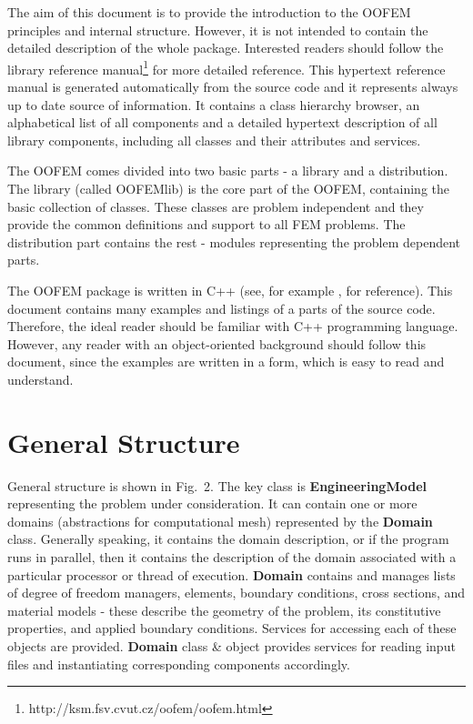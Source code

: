 \documentclass[12pt,draft]{article}
\newcommand{\class}[1]{{\bf #1}}
\newcommand{\refman}{\oofem library reference manual}
\begin{document}
The aim of this document is to provide the introduction to the OOFEM
principles and internal structure. However, it is not intended to
contain the detailed description of the whole package. Interested readers
should follow the \refman\footnote{http://ksm.fsv.cvut.cz/oofem/oofem.html} for more
detailed reference. This hypertext reference
manual is generated automatically from the source code and it
represents always up to date source of information. It contains a class
hierarchy browser, an alphabetical list of all components and a
detailed hypertext description of all library components, including
all classes and their attributes and services.


The OOFEM comes divided into two basic parts - a library and
a distribution. The library (called OOFEMlib) is the core part of the OOFEM, containing
the basic collection of classes. These classes are problem independent
and they provide the common definitions and support to all FEM
problems. The distribution part contains the rest - modules representing the problem dependent
parts. 

The OOFEM package is written in C++ (see, for example \cite{c++}, for reference). This 
document contains many examples and listings of a parts of the source
code. Therefore, the ideal reader should be familiar with C++ programming
language. However, any reader with an object-oriented background should
follow this document, since the examples are written in a form, which is 
easy to read and understand.

\section{General Structure}

General structure is shown in Fig.~2.
The key class is \class{EngineeringModel} representing the problem
under consideration. It can contain one or more domains (abstractions
for computational mesh) represented by the \class{Domain} class.
Generally
speaking, it contains the domain description, or if the program runs in
parallel, then it contains the description of the domain associated
with a particular processor or thread of execution. \class{Domain} 
contains and manages lists of degree of freedom managers, elements, boundary
conditions, cross sections, and material models - these describe the geometry
of the problem, its constitutive properties, and applied boundary
conditions. Services for accessing each of these objects are
provided. 
\class{Domain} class \& object provides services for reading input
files and instantiating corresponding components accordingly. 
\end{document}
